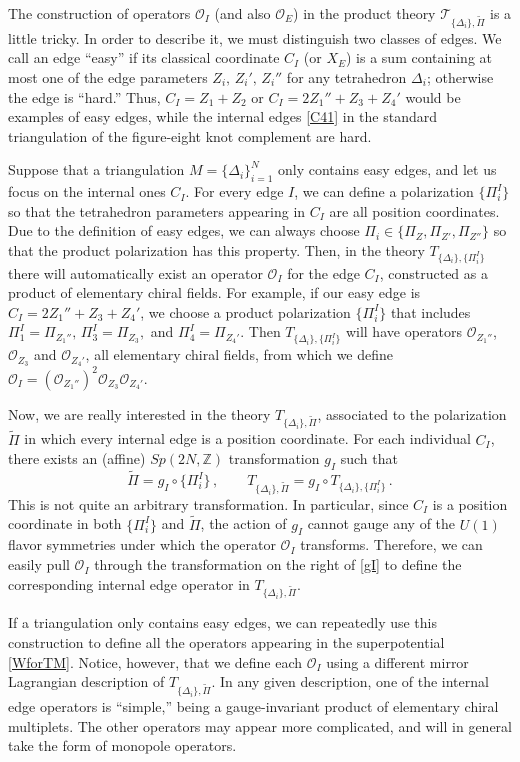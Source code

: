 \documentclass[hyper,letterpaper]{JHEP3}
\numberwithin{equation}{section}
\newcommand{\be}{\begin{equation}}
\newcommand{\ee}{\end{equation}}
\newcommand{\Z}{{\mathbb Z}}
\newcommand{\CO}{\mathcal{O}}
\newcommand{\CT}{\mathcal{T}}
\begin{document}
The construction of operators $\CO_I$ (and also $\CO_E$) in the product theory $\CT_{\{\Delta_i\},\tilde\Pi}$ is a little tricky. In order to describe it, we must distinguish two classes of edges. We call an edge ``easy'' if its classical coordinate $C_I$ (or $X_E$) is a sum containing at most one of the edge parameters $Z_i,\,Z_i',\,Z_i''$ for any tetrahedron $\Delta_i$; otherwise the edge is ``hard.'' Thus, $C_I = Z_1+Z_2$ or $C_I=2Z_1''+Z_3+Z_4'$ would be examples of easy edges, while the internal edges \eqref{C41} in the standard triangulation of the figure-eight knot complement are hard.

Suppose that a triangulation $M=\{\Delta_i\}_{i=1}^N$ only contains easy edges, and let us focus on the internal ones $C_I$. For every edge $I$, we can define a polarization $\{\Pi_i^I\}$ so that the tetrahedron parameters appearing in $C_I$ are all position coordinates. Due to the definition of easy edges, we can always choose $\Pi_i\in \{\Pi_Z,\Pi_{Z'},\Pi_{Z''}\}$ so that the product polarization has this property. Then, in the theory $T_{\{\Delta_i\},\{\Pi_i^I\}}$ there will automatically exist an operator $\CO_I$ for the edge $C_I$, constructed as a product of elementary chiral fields. For example, if our easy edge is $C_I = 2Z_1''+Z_3+Z_4'$, we choose a product polarization $\{\Pi_i^I\}$ that includes $\Pi_1^I = \Pi_{Z_1''},\,\Pi_3^I=\Pi_{Z_3},$ and $\Pi_4^I=\Pi_{Z_4'}$. Then $T_{\{\Delta_i\},\{\Pi_i^I\}}$ will have operators $\CO_{Z_1''}$, $\CO_{Z_3}$ and $\CO_{Z_4'}$, all elementary chiral fields, from which we define $\CO_I = (\CO_{Z_1''})^2\CO_{Z_3}\CO_{Z_4'}$.

Now, we are really interested in the theory $T_{\{\Delta_i\},\tilde\Pi}$, associated to the polarization $\tilde\Pi$ in which every internal edge is a position coordinate. For each individual $C_I$, there exists an (affine) $Sp(2N,\Z)$ transformation $g_I$ such that
%
\be \tilde\Pi = g_I\circ \{\Pi_i^I\}\,,\qquad T_{\{\Delta_i\},\tilde\Pi} = g_I\circ T_{\{\Delta_i\},\{\Pi_i^I\}}\,. \label{gI} \ee
%
This is not quite an arbitrary transformation. In particular, since $C_I$ is a position coordinate in both $\{\Pi_i^I\}$ and $\tilde \Pi$, the action of $g_I$ cannot gauge any of the $U(1)$ flavor symmetries under which the operator $\CO_I$ transforms. Therefore, we can easily pull $\CO_I$ through the transformation on the right of \eqref{gI} to define the corresponding internal edge operator in $T_{\{\Delta_i\},\tilde\Pi}$.


If a triangulation only contains easy edges, we can repeatedly use this construction to define all the operators appearing in the superpotential \eqref{WforTM}. Notice, however, that we define each $\CO_I$ using a different mirror Lagrangian description of $T_{\{\Delta_i\},\tilde\Pi}$. In any given description, one of the internal edge operators is ``simple,'' being a gauge-invariant product of elementary chiral multiplets. The other operators may appear more complicated, and will in general take the form of monopole operators.
\end{document}
